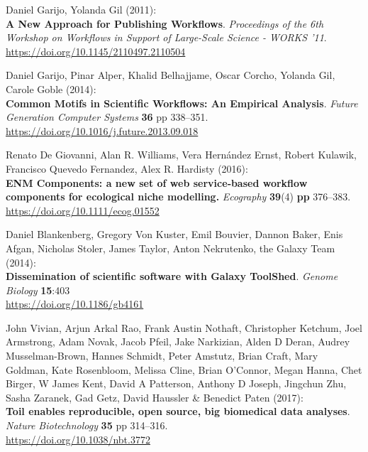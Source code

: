 \begin{thebibliography}{9}
Daniel Garijo, Yolanda Gil (2011):\\
\textbf{A New Approach for Publishing Workflows}. \emph{Proceedings of
the 6th Workshop on Workflows in Support of Large-Scale Science - WORKS
'11}.\\
\url{https://doi.org/10.1145/2110497.2110504}

Daniel Garijo, Pinar Alper, Khalid Belhajjame, Oscar Corcho,
Yolanda Gil, Carole Goble (2014):\\
\textbf{Common Motifs in Scientific Workflows: An Empirical Analysis}.
\emph{Future Generation Computer Systems} \textbf{36} pp 338--351.\\
\url{https://doi.org/10.1016/j.future.2013.09.018}

Renato De Giovanni, Alan R. Williams, Vera Hernández Ernst,
Robert Kulawik, Francisco Quevedo Fernandez, Alex R. Hardisty (2016):\\
\textbf{ENM Components: a new set of web service‐based workflow
components for ecological niche modelling.} \emph{Ecography}
\textbf{39}(4) \textbf{pp} 376--383.\\
\url{https://doi.org/10.1111/ecog.01552}

Daniel Blankenberg, Gregory Von Kuster, Emil Bouvier, Dannon
Baker, Enis Afgan, Nicholas Stoler, James Taylor, Anton Nekrutenko, the
Galaxy Team (2014):\\
\textbf{Dissemination of scientific software with Galaxy ToolShed}.
\emph{Genome Biology} \textbf{15}:403\\
\url{https://doi.org/10.1186/gb4161}

John Vivian, Arjun Arkal Rao, Frank Austin Nothaft, Christopher
Ketchum, Joel Armstrong, Adam Novak, Jacob Pfeil, Jake Narkizian, Alden
D Deran, Audrey Musselman-Brown, Hannes Schmidt, Peter Amstutz, Brian
Craft, Mary Goldman, Kate Rosenbloom, Melissa Cline, Brian O'Connor,
Megan Hanna, Chet Birger, W James Kent, David A Patterson, Anthony D
Joseph, Jingchun Zhu, Sasha Zaranek, Gad Getz, David Haussler \&
Benedict Paten (2017):\\
\textbf{Toil enables reproducible, open source, big biomedical data
analyses}. \emph{Nature Biotechnology} \textbf{35} pp 314--316.\\
\url{https://doi.org/10.1038/nbt.3772}




\end{thebibliography}

